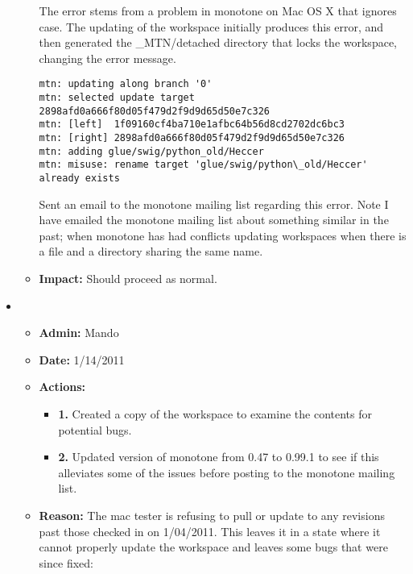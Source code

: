 \documentclass[12pt]{article}
\begin{document}
\begin{itemize}
\begin{itemize}
The error stems from a problem in monotone on Mac OS X that ignores case.  The updating of the workspace initially produces this error, and then generated the \_MTN/detached directory that locks the workspace, changing the error message.

\begin{verbatim}
mtn: updating along branch '0'
mtn: selected update target 2898afd0a666f80d05f479d2f9d9d65d50e7c326
mtn: [left]  1f09160cf4ba710e1afbc64b56d8cd2702dc6bc3
mtn: [right] 2898afd0a666f80d05f479d2f9d9d65d50e7c326
mtn: adding glue/swig/python_old/Heccer
mtn: misuse: rename target 'glue/swig/python\_old/Heccer' already exists
\end{verbatim}

Sent an email to the monotone mailing list regarding this error. Note I have emailed the monotone mailing list about something similar in the past; when monotone has had conflicts updating workspaces when there is a file and a directory sharing the same name. 

\item[] {\bf Impact:}  Should proceed as normal.
\end{itemize}


\item 
\begin{itemize}
\item[] {\bf Admin:} Mando
\item[] {\bf Date:} 1/14/2011
\item[] {\bf Actions:} 

\begin{itemize}
\item[] {\bf 1.} Created a copy of the workspace to examine the contents for potential bugs. 
\item[] {\bf 2.} Updated version of monotone from 0.47 to 0.99.1 to see if this alleviates some of the issues before posting to the monotone mailing list.
\end{itemize}

\item[] {\bf Reason:}  The mac tester is refusing to pull or update to any revisions past those checked in on 1/04/2011. This leaves it in a state where it cannot properly update the workspace and leaves some bugs that were since fixed:


\end{itemize}
\end{itemize}
\end{document}

